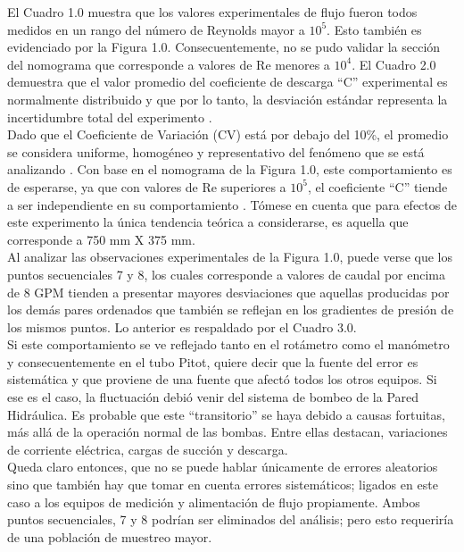 \documentclass[11pt, letterpaper]{article}
\begin{document}
El Cuadro 1.0 muestra que los valores experimentales de flujo fueron todos medidos en un rango del número de Reynolds mayor a ${10}^{5}$. Esto también es evidenciado por la Figura 1.0. Consecuentemente, no se pudo validar la sección del nomograma que corresponde a valores de Re menores a ${10}^{4}$. El Cuadro 2.0 demuestra que el valor promedio del coeficiente de descarga “C” experimental es normalmente distribuido y que por lo tanto, la desviación estándar representa la incertidumbre total del experimento \cite{mott}.\\ 
Dado que el Coeficiente de Variación (CV) está por debajo del 10\%, el promedio se considera uniforme, homogéneo y representativo del fenómeno que se está analizando \cite{saldarriaga}. Con base en el nomograma de la Figura 1.0, este comportamiento es de esperarse, ya que con valores de Re superiores a ${10}^{5}$, el coeficiente “C” tiende a ser independiente en su comportamiento \cite{potter}.  Tómese en cuenta que para efectos de este experimento la única tendencia teórica a considerarse, es aquella que corresponde a 750 mm X 375 mm.\\ 
Al analizar las observaciones experimentales de la Figura 1.0, puede verse que los puntos secuenciales 7 y 8, los cuales corresponde a valores de caudal por encima de 8 GPM tienden a presentar mayores desviaciones que aquellas producidas por los demás pares ordenados que también se reflejan en los gradientes de presión de los mismos puntos. Lo anterior es respaldado por el Cuadro 3.0.\\ 
Si este comportamiento se ve reflejado tanto en el rotámetro como el manómetro y consecuentemente en el tubo Pitot, quiere decir que la fuente del error es sistemática y que proviene de una fuente que afectó todos los otros equipos. Si ese es el caso, la fluctuación debió venir del sistema de bombeo de la Pared Hidráulica. Es probable que este “transitorio” se haya debido a causas fortuitas, más allá de la operación normal de las bombas. Entre ellas destacan, variaciones de corriente eléctrica, cargas de succión y descarga.\\ 
Queda claro entonces, que no se puede hablar únicamente de errores aleatorios sino que también hay que tomar en cuenta errores sistemáticos; ligados en este caso a los equipos de medición y alimentación de flujo propiamente. Ambos puntos secuenciales, 7 y 8 podrían ser eliminados del análisis; pero esto requeriría de una población de muestreo mayor.
\pagebreak

\end{document}
